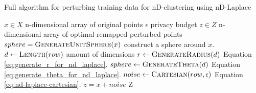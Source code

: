 \begin{algorithm}[H]
   \caption{Full algorithm for perturbing training data for nD-clustering using nD-Laplace}
   \begin{algorithmic}
      \Require $x \in X$  \Comment n-dimensional array of original points
      \Require $\epsilon$ \Comment privacy budget
      \Ensure $z \in Z$ \Comment n-dimensional array of optimal-remapped perturbed points
      \State $sphere = \Call{GenerateUnitSphere}{x}$ \Comment construct a sphere around $x$.
      \State $d \gets \Call{Length}{row}$ \Comment amount of dimensions
      \State $r \gets \Call{GenerateRadius}{d}$ \Comment Equation \ref{eq:generate_r_for_nd_laplace}.
      \State $sphere \gets \Call{GenerateTheta}{d}$ \Comment Equation \ref{eq:generate_theta_for_nd_laplace}.
      \State $noise \gets \Call{Cartesian}{row, \epsilon}$ \Comment Equation \ref{eq:nd-laplace-cartesian}.
      \State $z = x + noise$
      \State {}
      \EndFor
      \State \Return Z
   \end{algorithmic}
   \label{alg:nd-laplace}
\end{algorithm}